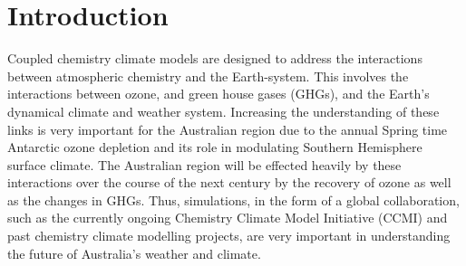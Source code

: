 \section{Introduction} 

Coupled chemistry climate models are designed to address the interactions between atmospheric chemistry and the Earth-system. This involves the interactions between ozone, and green house gases (GHGs), and the Earth's dynamical climate and weather system. Increasing the understanding of these links is very important for the Australian region due to the annual Spring time Antarctic ozone depletion and its role in modulating Southern Hemisphere surface climate. The Australian region will be effected heavily by these interactions over the course of the next century by the recovery of ozone as well as the changes in GHGs. Thus, simulations, in the form of a global collaboration, such as the currently ongoing Chemistry Climate Model Initiative (CCMI) \citep{Eyring:2013tg} and past chemistry climate modelling projects,  are very important in understanding the future of Australia's weather and climate.

